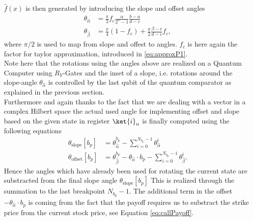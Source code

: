 \documentclass[../../main.tex]{subfiles}
\begin{document}
$\hat{f}(x)$ is then generated by introducing the slope and offset angles
\begin{align}\label{eq:affineAngles}
  \theta_{\hat{\alpha}} &= \frac{\pi}{2}f_c\frac{\alpha}{2^n-1}\frac{b-a}{d-c}\\
  \theta_{\hat{\beta}} &=\frac{\pi}{4}(1-f_c) + \frac{\pi}{2}\frac{\beta-c}{d-c}f_c,
\end{align}
where $\pi/2$ is used to map from slope and offest to angles. $f_c$ is here again the factor for taylor approximation, introduced in \ref{eq:approxP1}.\\
Note here that the rotations using the angles above are realized on a Quantum Computer using $R_Y$-Gates
and the inset of a slope, i.e. rotations around the slope-angle $\theta_{\hat{\alpha}}$ is controlled by the last qubit of the quantum comparator
as explained in the previous section.\\
Furthermore and again thanks to the fact that we are dealing with a vector in a complex Hilbert space the actual used angle for implementing offset and slope
based on the given state in register $\ket{i}_n$ is finally computed using the following equations
\begin{align}
\theta_{\text{slope}}[b_p] &= \theta_{\hat{\alpha}}^{b_p} - \sum_{i=0}^{N_{b_p} - 1}\theta_{\hat{\alpha}}^{i} \label{eq:finalAngle} \\
\theta_{\text{offset}}[b_p] &= \theta_{\hat{\beta}}^{b_p} - \theta_{\hat{\alpha}} \cdot b_p - \sum_{i=0}^{N_{b_p} - 1}\theta_{\hat{\beta}}^{i} \label{eq:finalOffest}.
\end{align}
Hence the angles which have already been used for rotating the current state are substracted from the final slope angle $\theta_{\text{slope}}[b_p]$
This is realized through the summation to the last breakpoint $N_{b_p} - 1$. The additional term in the offset $ - \theta_{\hat{\alpha}} \cdot b_p$ is coming from the fact that the payoff
requires us to substract the strike price from the current stock price, see Equation \ref{eq:callPayoff}.\\
\end{document}
